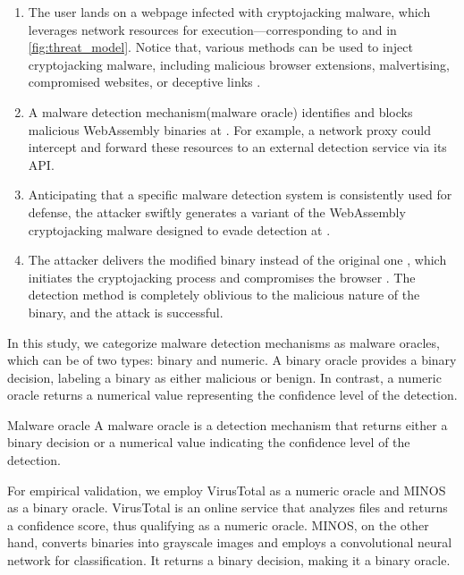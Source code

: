 \begin{enumerate}
    
    \item The user lands on a webpage infected with cryptojacking malware, which leverages network resources for execution—corresponding to  and  in \autoref{fig:threat_model}. 
    Notice that, various methods can be used to inject cryptojacking malware, including malicious browser extensions, malvertising, compromised websites, or deceptive links \cite{9566204}.
    
    \item A malware detection mechanism(malware oracle) identifies and blocks malicious WebAssembly binaries at . 
    For example, a network proxy could intercept and forward these resources to an external detection service via its API.
    
    \item Anticipating that a specific malware detection system is consistently used for defense, the attacker swiftly generates a variant of the WebAssembly cryptojacking malware designed to evade detection at .
    
    \item The attacker delivers the modified binary instead of the original one , which initiates the cryptojacking process and compromises the browser . The detection method is completely oblivious to the malicious nature of the binary, and the attack is successful.
    
\end{enumerate}



In this study, we categorize malware detection mechanisms as malware oracles, which can be of two types: binary and numeric. 
A binary oracle provides a binary decision, labeling a \Wasm binary as either malicious or benign. 
In contrast, a numeric oracle returns a numerical value representing the confidence level of the detection.

\begin{definition}{Malware oracle}
    \label{malware_oracle_def}
    A malware oracle is a detection mechanism that returns either a binary decision or a numerical value indicating the confidence level of the detection.
\end{definition}


For empirical validation, we employ VirusTotal as a numeric oracle and MINOS \cite{MINOS} as a binary oracle. 
VirusTotal is an online service that analyzes files and returns a confidence score, thus qualifying as a numeric oracle. 
MINOS, on the other hand, converts \Wasm binaries into grayscale images and employs a convolutional neural network for classification. 
It returns a binary decision, making it a binary oracle.


